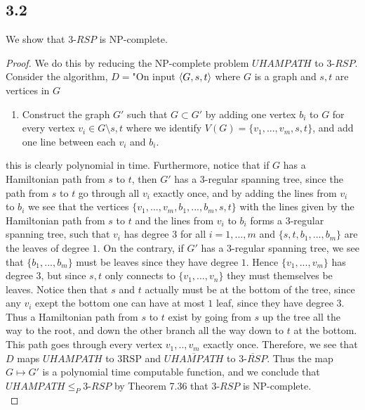 \documentclass[a4paper,11pt]{article}
\numberwithin{equation}{section}
\begin{document}
\subsection*{3.2}
We show that $ 3\text{-}RSP $ is NP-complete.\begin{proof}
	We do this by reducing the NP-complete problem $ UHAMPATH $ to $ 3\text{-}RSP $. Consider the algorithm, $ D= $"On input $ \braket{G,s,t} $ where $ G $ is a graph and $ s,t $ are vertices in $ G $\begin{enumerate}
		\item Construct the graph $ G' $ such that $ G\subset G' $ by adding one vertex $ b_i $ to $ G $ for every vertex $ v_i\in G\setminus{s,t} $ where we identify $ V(G)=\{v_1,...,v_m,s,t\} $, and add one line between each $ v_i $ and $ b_i $.
	\end{enumerate}
	this is clearly polynomial in time. Furthermore, notice that if $ G $ has a Hamiltonian path from $ s $ to $ t $, then $ G' $ has a 3-regular spanning tree, since the path from $ s $ to $ t $ go through all $ v_i $ exactly once, and by adding the lines from $ v_i $ to $ b_i $ we see that the vertices $ \{v_1,...,v_m,b_1,...,b_m,s,t\} $ with the lines given by the Hamiltonian path from $ s $ to $ t $ and the lines from $ v_i $ to $ b_i $ forms a 3-regular spanning tree, such that $ v_i $ has degree $ 3 $ for all $ i=1,...,m $ and $ \{s,t,b_1,...,b_m\} $ are the leaves of degree $ 1 $. On the contrary, if $ G' $ has a 3-regular spanning tree, we see that $ \{b_1,...,b_m\} $ must be leaves since they have degree $ 1 $. Hence $ \{v_1,...,v_m\} $ has degree 3, but since $ s,t $ only connects to $ \{v_1,...,v_n\} $ they must themselves be leaves. Notice then that $ s $ and $ t $ actually must be at the bottom of the tree, since any $ v_i $ exept the bottom one can have at most $ 1 $ leaf, since they have degree $ 3 $. Thus a Hamiltonian path from $ s $ to $ t $ exist by going from $ s $ up the tree all the way to the root, and down the other branch all the way down to $ t $ at the bottom. This path goes through every vertex $ v_1,..,v_m $ exactly once. Therefore, we see that $ D $ maps $ UHAMPATH $ to $ 3\text{RSP} $ and $ \overline{UHAMPATH} $ to $ \overline{3\text{-}RSP} $. Thus the map $ G\mapsto G' $ is a polynomial time computable function, and we conclude that $ UHAMPATH\leq_P 3\text{-}RSP $ by Theorem 7.36 that $ 3\text{-}RSP $ is NP-complete.\\

\end{proof}
\end{document}
